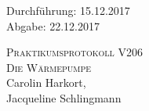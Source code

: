 

\begin{titlepage}
  \begin{flushleft}
 Durchführung: 15.12.2017\\
 Abgabe: 22.12.2017
  \end{flushleft}



 \begin{center}


\textsc{\LARGE Praktikumsprotokoll V206}\\[1.5cm]
\textsc{\huge Die Wärmepumpe } \\[5,5cm]

Carolin Harkort\footnotemark[1], \\
Jacqueline Schlingmann\footnotemark[2] \\[1,0cm]



 \end{center}

 \vfill

\end{titlepage}


  
  

\nocite{*}
\printbibliography

